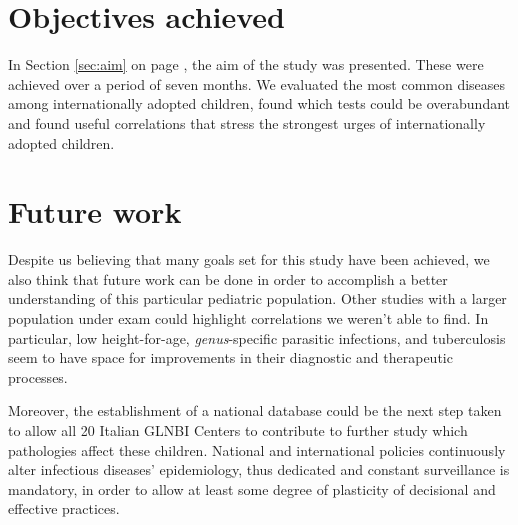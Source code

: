 \section{Objectives achieved}\label{secd:objectivesachieved}
In Section \ref{sec:aim} on page \pageref{sec:aim}, the aim of the study was presented. These were achieved over a period of seven months. We evaluated the most common diseases among internationally adopted children, found which tests could be overabundant and found useful correlations that stress the strongest urges of internationally adopted children.

\section{Future work}\label{sec:futurework}
Despite us believing that many goals set for this study have been achieved, we also think that future work can be done in order to accomplish a better understanding of this particular pediatric population. Other studies with a larger population under exam could highlight correlations we weren't able to find. In particular, low height-for-age, \textit{genus}-specific parasitic infections, and tuberculosis seem to have space for improvements in their diagnostic and therapeutic processes.

Moreover, the establishment of a national database could be the next step taken to allow all 20 Italian GLNBI Centers to contribute to further study which pathologies affect these children. National and international policies continuously alter infectious diseases' epidemiology, thus dedicated and constant surveillance is mandatory, in order to allow at least some degree of plasticity of decisional and effective practices.  